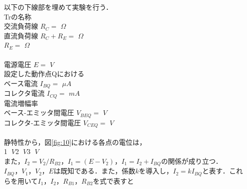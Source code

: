 \documentclass[10pt, a4j, dvipdfmx]{jarticle}
\begin{document}
    以下の下線部を埋めて実験を行う．\\
    Trの名称\hspace{25mm}\underline{\hspace{30mm}}\\
    交流負荷線 $R_C = $    \underline{\hspace{20mm}}$\Omega$\\
    直流負荷線 $R_C + R_E = $  \underline{\hspace{20mm}}$\Omega$\\
               $R_E = $     \underline{\hspace{20mm}}$\Omega$\\
    \\
    電源電圧 $E = $ \underline{\hspace{20mm}}$V$\\
    設定した動作点Qにおける\\
    ベース電流 $I_{BQ} = $ \underline{\hspace{20mm}}$\mu A$\\
    コレクタ電流 $I_{CQ} = $ \underline{\hspace{20mm}}$mA$\\
    電流増幅率 \underline{\hspace{20mm}}\\
    ベース-エミッタ間電圧 $V_{BEQ} = $ \underline{\hspace{20mm}}$V$\\
    コレクタ-エミッタ間電圧 $V_{CEQ} = $ \underline{\hspace{20mm}}$V$\\
    \\
    静特性から，図\ref{fig:10}における各点の電位は，\\
    \hspace{7mm}\textcircled{\scriptsize 1} \underline{\hspace{20mm}}$V$\hspace{7mm}\textcircled{\scriptsize 2} \underline{\hspace{20mm}}$V$\hspace{7mm}\textcircled{\scriptsize 3} \underline{\hspace{20mm}}$V$\\
    また，$I_2 = V_2 / R_{B2}$，$I_1 = (E - V_2)$，$I_1 = I_2 + I_{BQ}$の関係が成り立つ．\\
    $I_{BQ}$，$V_1$，$V_2$，$E$は既知である．また，係数$k$を導入し，$I_2 = k I_{BQ}$と表す．これらを用いて$I_1$，$I_2$，$R_{B1}$，$R_{B2}$を式で表すと\\
\end{document}
